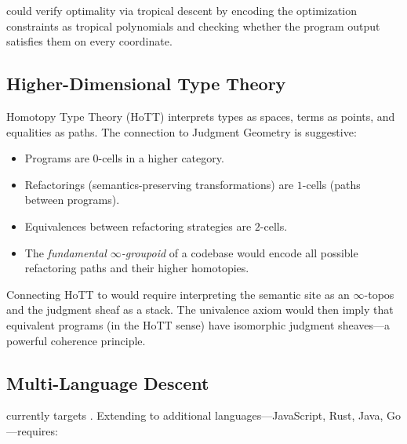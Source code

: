 \noindent
\JuGeo{} could verify optimality via tropical descent by encoding the
optimization constraints as tropical polynomials and checking
whether the program output satisfies them on every coordinate.

\subsection{Higher-Dimensional Type Theory}\label{sec:future-hott}

Homotopy Type Theory (HoTT) interprets types as spaces, terms as
points, and equalities as paths.  The connection to Judgment Geometry
is suggestive:

\begin{itemize}[leftmargin=1.5em]
  \item Programs are $0$-cells in a higher category.
  \item Refactorings (semantics-preserving transformations) are
    $1$-cells (paths between programs).
  \item Equivalences between refactoring strategies are $2$-cells.
  \item The \emph{fundamental $\infty$-groupoid} of a codebase
    would encode all possible refactoring paths and their
    higher homotopies.
\end{itemize}

\noindent
Connecting HoTT to \JuGeo{} would require interpreting the semantic
site as an $\infty$-topos and the judgment sheaf as a stack.  The
univalence axiom would then imply that equivalent programs (in the
HoTT sense) have isomorphic judgment sheaves---a powerful
coherence principle.

\subsection{Multi-Language Descent}\label{sec:future-multilang}

\JuGeo{} currently targets \Python{}.  Extending to additional
languages---JavaScript, Rust, Java, Go---requires:

